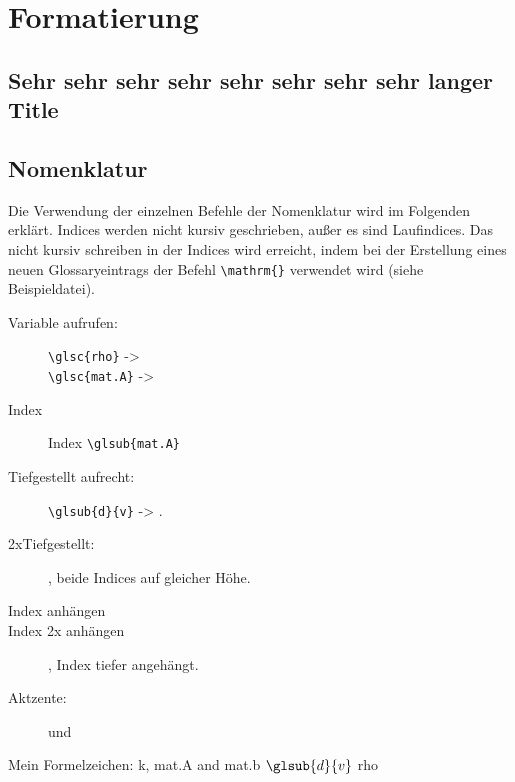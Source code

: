 %
\chapter{Formatierung}
\label{chap:Formatierung}

\section[Kurzer Title]{Sehr sehr sehr sehr sehr sehr sehr sehr langer Title}
\label{sec:Title}


\section{Nomenklatur}
\label{sec:nomenklatur}
Die Verwendung der einzelnen Befehle der Nomenklatur wird im Folgenden erklärt. 
Indices werden nicht kursiv geschrieben, außer es sind Laufindices. Das nicht kursiv schreiben in der Indices wird erreicht, indem bei der Erstellung eines neuen Glossaryeintrags der Befehl \verb=\mathrm{}= verwendet wird (siehe Beispieldatei).  


\begin{description}
	\item[Variable aufrufen:] \verb=\glsc{rho}= -> \\
	\verb=\glsc{mat.A}= -> 
	\item[Index] Index \verb=\glsub{mat.A}=
	\item[Tiefgestellt aufrecht:]  \verb== -> \glsub{d}{v}.
	\item[2xTiefgestellt:]  , beide Indices auf gleicher Höhe.
	\item[Index anhängen] 
	\item[Index 2x anhängen]  , Index tiefer angehängt.
	\item[Aktzente:]  und 
\end{description}

Mein Formelzeichen:   \gls{k}, \gls{mat.A} and \gls{mat.b} $\glsub{d}{v}$ 
  \gls{rho}%

